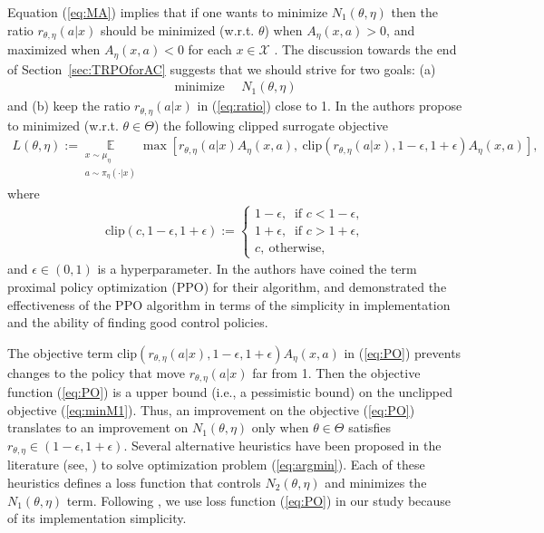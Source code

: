\documentclass[11pt]{article}
\newcommand{\E}{\mathbb{E}}
\newcommand{\X}{\mathcal{X}}
\theoremstyle{definition}
\numberwithin{equation}{section}
\begin{document}
Equation (\ref{eq:MA}) implies that if one wants to minimize $N_1(\theta, \eta)$ then the ratio $r_{\theta, \eta}(a|x)$ should be minimized (w.r.t. $\theta$) when $A_\eta(x,a)>0$, and maximized when $A_\eta(x,a)<0$  for each $x\in \X$ .
The discussion towards the end of Section~\ref{sec:TRPOforAC} suggests
that we should strive for two goals: (a)
\begin{align}\label{eq:minM1}
\text{minimize } \quad N_1(\theta, \eta)
\end{align}
and (b) keep the ratio $r_{\theta, \eta}(a|x)$ in (\ref{eq:ratio})
close to 1. In \cite{Schulman2017} the authors propose to minimized
(w.r.t. $\theta\in \Theta$) the following clipped surrogate objective
\begin{align}\label{eq:PO}
L(\theta, \eta):=\underset{\substack{ x\sim \mu_{\eta}\\ a\sim \pi_{\eta}(\cdot|x)  }  }{\E}   \max \left[  r_{\theta, \eta}(a|x) A_{\eta} (x, a) ,  ~ \text{clip} (r_{\theta, \eta}(a|x),  1-\epsilon, 1+\epsilon)  A_{\eta} (x, a)  \right],
\end{align}
where
\begin{align*}
  \text{clip}(c,  1-\epsilon, 1+\epsilon):= \begin{cases} 1-\epsilon,~\text{ if } c<1-\epsilon,\\   1+\epsilon,~\text{ if } c>1+\epsilon,\\ c, ~\text{otherwise,}\end{cases}
\end{align*}
and $\epsilon\in(0, 1)$ is a hyperparameter. In \cite{Schulman2017} the authors have coined the term
proximal policy optimization (PPO) for their algorithm, and
demonstrated the effectiveness of the PPO algorithm in terms of the
simplicity in implementation and the ability of finding good control
policies.

The objective term
$\text{clip} (r_{\theta, \eta}(a|x), 1-\epsilon, 1+\epsilon) A_{\eta}
(x, a) $ in (\ref{eq:PO}) prevents changes to the policy that
move $ r_{\theta, \eta}(a|x) $ far from 1. Then the objective function
(\ref{eq:PO}) is a upper bound (i.e., a pessimistic bound) on the
unclipped objective (\ref{eq:minM1}).  Thus, an improvement on the
objective (\ref{eq:PO}) translates to an improvement on
$N_1(\theta, \eta)$ only when $\theta\in \Theta$ satisfies
$r_{\theta, \eta}\in (1-\epsilon, 1+\epsilon)$.  Several alternative
heuristics have been proposed in the literature (see,
\cite{Schulman2015, Wang2016, Schulman2017, Wu2017}) to solve
optimization problem (\ref{eq:argmin}). Each of these heuristics
defines a loss function that controls $N_2(\theta, \eta)$ and
minimizes the $N_1(\theta, \eta)$ term.
Following \cite{Schulman2017}, we use loss function
(\ref{eq:PO}) in our study because of its implementation simplicity.
\end{document}
